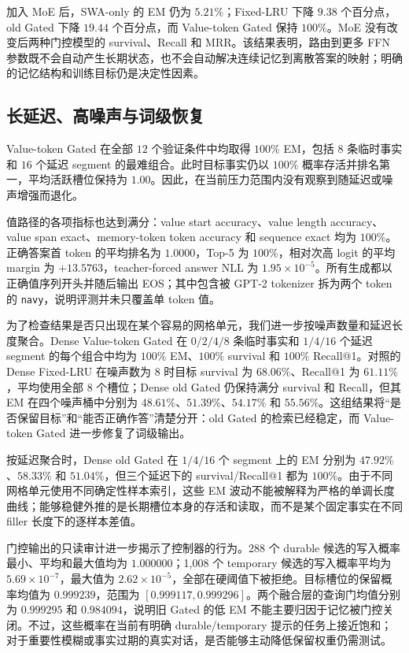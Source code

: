 \documentclass[letterpaper]{article}
\begin{document}
加入 MoE 后，SWA-only 的 EM 仍为 $5.21\%$；Fixed-LRU 下降 $9.38$ 个百分点，old Gated 下降 $19.44$ 个百分点，而 Value-token Gated 保持 $100\%$。MoE 没有改变后两种门控模型的 survival、Recall 和 MRR。该结果表明，路由到更多 FFN 参数既不会自动产生长期状态，也不会自动解决连续记忆到离散答案的映射；明确的记忆结构和训练目标仍是决定性因素。

\subsection{长延迟、高噪声与词级恢复}

Value-token Gated 在全部 $12$ 个验证条件中均取得 $100\%$ EM，包括 $8$ 条临时事实和 $16$ 个延迟 segment 的最难组合。此时目标事实仍以 $100\%$ 概率存活并排名第一，平均活跃槽位保持为 $1.00$。因此，在当前压力范围内没有观察到随延迟或噪声增强而退化。

值路径的各项指标也达到满分：value start accuracy、value length accuracy、value span exact、memory-token token accuracy 和 sequence exact 均为 $100\%$。正确答案首 token 的平均排名为 $1.0000$，Top-5 为 $100\%$，相对次高 logit 的平均 margin 为 $+13.5763$，teacher-forced answer NLL 为 $1.95\times10^{-5}$。所有生成都以正确值序列开头并随后输出 EOS；其中包含被 GPT-2 tokenizer 拆为两个 token 的 \texttt{navy}，说明评测并未只覆盖单 token 值。

为了检查结果是否只出现在某个容易的网格单元，我们进一步按噪声数量和延迟长度聚合。Dense Value-token Gated 在 $0/2/4/8$ 条临时事实和 $1/4/16$ 个延迟 segment 的每个组合中均为 $100\%$ EM、$100\%$ survival 和 $100\%$ Recall@1。对照的 Dense Fixed-LRU 在噪声数为 $8$ 时目标 survival 为 $68.06\%$、Recall@1 为 $61.11\%$，平均使用全部 $8$ 个槽位；Dense old Gated 仍保持满分 survival 和 Recall，但其 EM 在四个噪声桶中分别为 $48.61\%$、$51.39\%$、$54.17\%$ 和 $55.56\%$。这组结果将“是否保留目标”和“能否正确作答”清楚分开：old Gated 的检索已经稳定，而 Value-token Gated 进一步修复了词级输出。

按延迟聚合时，Dense old Gated 在 $1/4/16$ 个 segment 上的 EM 分别为 $47.92\%$、$58.33\%$ 和 $51.04\%$，但三个延迟下的 survival/Recall@1 都为 $100\%$。由于不同网格单元使用不同确定性样本索引，这些 EM 波动不能被解释为严格的单调长度曲线；能够稳健外推的是长期槽位本身的存活和读取，而不是某个固定事实在不同 filler 长度下的逐样本差值。

门控输出的只读审计进一步揭示了控制器的行为。288 个 durable 候选的写入概率最小、平均和最大值均为 $1.000000$；1,008 个 temporary 候选的写入概率平均为 $5.69\times10^{-7}$，最大值为 $2.62\times10^{-5}$，全部在硬阈值下被拒绝。目标槽位的保留概率均值为 $0.999239$，范围为 $[0.999117,0.999296]$。两个融合层的查询门均值分别为 $0.999295$ 和 $0.984094$，说明旧 Gated 的低 EM 不能主要归因于记忆被门控关闭。不过，这些概率在当前有明确 durable/temporary 提示的任务上接近饱和；对于重要性模糊或事实过期的真实对话，是否能够主动降低保留权重仍需测试。
\end{document}
